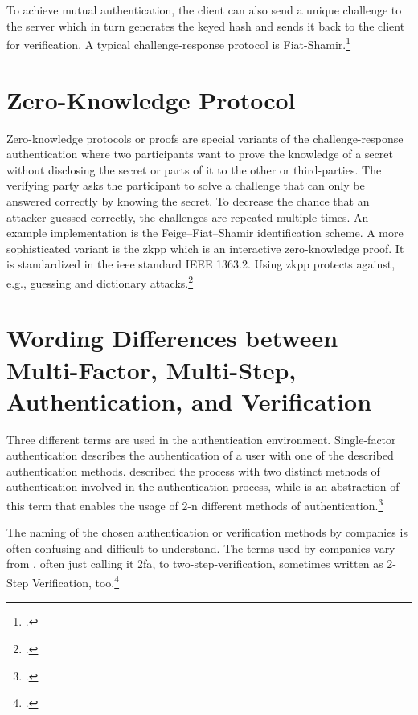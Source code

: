 To achieve mutual authentication, the client can also send a unique challenge to the server which in turn generates the keyed hash and sends it back to the client for verification. A typical challenge-response protocol is Fiat-Shamir.\footcites[See][Chapter 13.6]{waschke2017personal}[See][489--491]{eckert-it-sec-9}

\section{Zero-Knowledge Protocol}

Zero-knowledge protocols or proofs are special variants of the challenge-response authentication where two participants want to prove the knowledge of a secret without disclosing the secret or parts of it to the other or third-parties. The verifying party asks the participant to solve a challenge that can only be answered correctly by knowing the secret. To decrease the chance that an attacker guessed correctly, the challenges are repeated multiple times. An example implementation is the Feige–Fiat–Shamir identification scheme. A more sophisticated variant is the \gls{zkpp} which is an interactive zero-knowledge proof. It is standardized in the \gls{ieee} standard IEEE 1363.2. Using \gls{zkpp} protects against, e.g., guessing and dictionary attacks.\footcites[See][492]{eckert-it-sec-9}[See][Chapter 28.3.7]{1174011}[See][769--770]{FISCHERHBNER2017759}[See][]{Feige1988}

\section{Wording Differences between Multi-Factor, Multi-Step, Authentication, and Verification}

Three different terms are used in the authentication environment. Single-factor authentication describes the authentication of a user with one of the described authentication methods.  described the process with two distinct methods of authentication involved in the authentication process, while  is an abstraction of this term that enables the usage of 2-n different methods of authentication.\footcites[See][186--188]{dasgupta2017multi}

The naming of the chosen authentication or verification methods by companies is often confusing and difficult to understand. The terms used by companies vary from , often just calling it \gls{2fa}, to two-step-verification, sometimes written as 2-Step Verification, too.\footcites[See][]{apple_2fa}[See][]{apple_s2v}[See][]{playstation}[See][]{google_2-step_verification}[See][]{microsoft_2sv}

